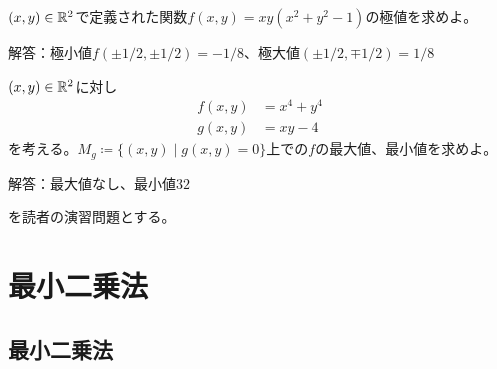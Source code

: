 \documentclass[report]{jlreq}
\begin{document}
\begin{problem}
    $(x, y) \in \mathbb{R}^2$で定義された関数$f(x, y) = xy (x^2 + y^2 - 1)$の極値を求めよ。

    解答：極小値$f(\pm 1/2, \pm 1/2) = -1/8$、極大値$(\pm 1/2, \mp 1/2) = 1/8$
\end{problem}

\begin{problem}
    $(x, y) \in \mathbb{R}^2$に対し
    \begin{equation}
        \begin{split}
            f(x, y) &= x^4 + y^4 \\
            g(x, y) &= xy - 4
        \end{split}
    \end{equation}
    を考える。$M_g \coloneqq \{ (x, y) \mid g(x, y) = 0 \}$上での$f$の最大値、最小値を求めよ。

    解答：最大値なし、最小値$32$
\end{problem}

\begin{problem}
    \cite[第II章 問題7.1, 7.2, 7.4]{杉浦+89}を読者の演習問題とする。
\end{problem}



%
\chapter{最小二乗法}

%
\section{最小二乗法}
\end{document}
